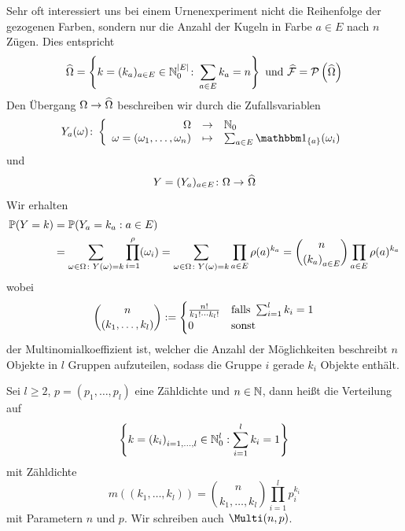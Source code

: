 Sehr oft interessiert uns bei einem Urnenexperiment nicht die Reihenfolge der gezogenen Farben, sondern nur die Anzahl der Kugeln in Farbe $a \in E$ nach $n$ Zügen. Dies entspricht
\begin{equation*}
	 \widehat{\Omega} 
	 = \left\{ k = (k_a)_{a \in E} \in \mathbb{N}_{0}^{\left| E \right|} \colon \sum_{a \in E} k_a = n \right\}
	 \text{ und } \widehat{\mathcal{F}} = \mathcal{P}\left( \widehat{\Omega} \right)
\end{equation*}
Den Übergang $\Omega \to \widehat{\Omega}$ beschreiben wir durch die Zufallsvariablen
\begin{equation*}
	\bigabb{Y_a(\omega)}{\Omega}{\N_{0}}%
    {\omega = (\omega_1,\dots, \omega_n)}%
    {\sum_{a \in E} \one_{\menge{a}}(\omega_i)} 
\end{equation*}
und
\begin{equation*}
	\abb{Y = (Y_a)_{a \in E}}{\Omega}{\dach{\Omega}}
\end{equation*}
Wir erhalten
\begin{equation*}
	\begin{aligned}
		\P(Y=k) &= \P(Y_a = k_a : a \in E) \\
		&= \sum_{\omega \in \Omega \colon Y(\omega) = k} \prod_{i=1}^ \rho(\omega_i)
		= \sum_{\omega \in \Omega \colon Y(\omega) = k} \prod_{a \in E} \rho(a)^{k_a} 
		= \binom{n}{\folge{k_a}[a \in E]} \prod_{a \in E} \rho(a)^{k_a}
	\end{aligned}
\end{equation*}
wobei
\begin{equation*}
	\binom{n}{(k_1 , \dots , k_l)} \mathrel{:=} \begin{cases}
	\frac{n!}{k_1 ! \cdots k_l !} & \text{falls } \sum_{i=1}^l k_i = 1 \\
	0 & \text{sonst}
	\end{cases}
\end{equation*}
der Multinomialkoeffizient ist, welcher die Anzahl der Möglichkeiten beschreibt $n$ Objekte in $l$ Gruppen aufzuteilen, sodass die Gruppe $i$ gerade $k_i$ Objekte enthält.

\begin{definition}
	Sei $l \geq 2$, $p=(p_1 , \dots , p_l)$ eine Zähldichte und $n \in \mathbb{N}$, dann heißt die Verteilung auf 
	\begin{equation*}
		\menge{k=\folge{k_i}[i=1, \dots , l] \in \N_0^l : \sum_{i=1}^l k_i = 1}
	\end{equation*}
	mit Zähldichte
	\begin{equation*}
		m((k_1 , \dots , k_l)) = \binom{n}{k_1 , \dots , k_l} \prod_{i=1}^l p_i^{k_i}
	\end{equation*}
	 mit Parametern $n$ und $p$. Wir schreiben auch $\Multi(n,p)$.
\end{definition}

